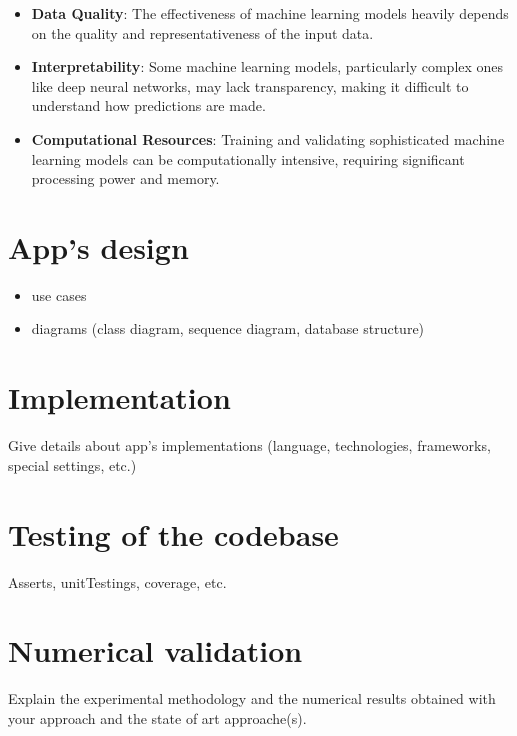 \documentclass[runningheads,a4paper,11pt]{report}
\begin{document}
\begin{itemize}
    \item \textbf{Data Quality}: The effectiveness of machine learning models heavily depends on the quality and representativeness of the input data.
    \item \textbf{Interpretability}: Some machine learning models, particularly complex ones like deep neural networks, may lack transparency, making it difficult to understand how predictions are made.
    \item \textbf{Computational Resources}: Training and validating sophisticated machine learning models can be computationally intensive, requiring significant processing power and memory.
\end{itemize}
 


\section{App's design}
\label{section:appDesign}

\begin{itemize}
	\item use cases
	\item diagrams (class diagram, sequence diagram, database structure)
\end{itemize}


\section{Implementation}
\label{section:appImplementation}

Give details about app's implementations (language, technologies, frameworks, special settings, etc.)


\section{Testing of the codebase}
\label{section:appTesting}

Asserts, unitTestings, coverage, etc.


\section{Numerical validation}
\label{section:numericalValidation}

Explain the experimental methodology and the numerical results obtained with your approach and the state of art approache(s).
\end{document}
